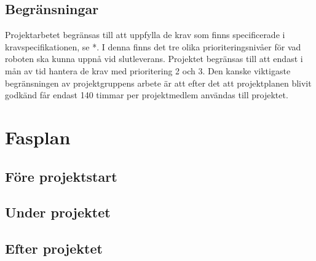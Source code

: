 \documentclass[a4paper,12pt]{article}
\begin{document}
\subsection{Begränsningar}
Projektarbetet begränsas till att uppfylla de krav som finns specificerade i kravspecifikationen, se *. I denna finns det tre olika prioriteringsnivåer för vad roboten ska kunna uppnå vid slutleverans. Projektet begränsas till att endast i mån av tid hantera de krav med prioritering 2 och 3.
Den kanske viktigaste begränsningen av projektgruppens arbete är att efter det att projektplanen blivit godkänd får endast 140 timmar per projektmedlem användas till projektet.

\section{Fasplan}		
\subsection{Före projektstart}
\subsection{Under projektet}
\subsection{Efter projektet}
\end{document}
